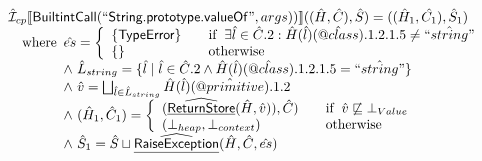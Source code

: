 \[\begin{array}{l}
\aI _{cp}\lbr \SF{BuiltintCall}(``\SF{String.prototype.valueOf}",args))\rbr((\hat{H},\hat{C}), \hat{S})
  = ((\hat{H}_1, \hat{C_1}), \hat{S}_1)\\
\quad\wherec{
  \hat{es} = \left\{\begin{array}{l@{\quad\quad}l}
      \{ \SF{TypeError} \}
      & \ifc{\exists \hat{l} \in \hat{C}.2 : \hat{H}(\hat{l})(\avarprop{class}).1.2.1.5  \neq \hat{``string"}}\\
      \{ \}& \owc\\
    \end{array}\right.\\
  \land\ \hat{L}_{string} = \{ \hat{l} \mid \hat{l} \in \hat{C}.2 \land \hat{H}(\hat{l})(\avarprop{class}).1.2.1.5  = \hat{``string"}\}\\
  \land\ \hat{v} = \bigsqcup_{\hat{l} \in \hat{L}_{string}} \hat{H}(\hat{l})(\avarprop{primitive}).1.2\\
  \land\ (\hat{H}_1, \hat{C}_1) = 
    \left\{\begin{array}{l@{\quad\quad}l}
      (\ahf{ReturnStore}(\hat{H}, \hat{v})), \hat{C})
      & \ifc{\hat{v} \not\sqsubseteq \bot_{Value}}\\
      (\bot_{heap}, \bot_{context}) & \owc \\
    \end{array}\right.\\
  \land\ \hat{S}_1 = \hat{S} \sqcup \ahf{RaiseException}(\hat{H}, \hat{C}, \hat{es})\\
  }\\
\\\\





\end{array}\]
